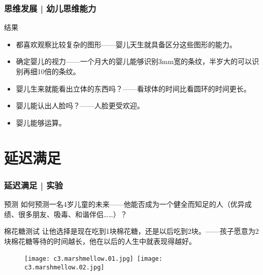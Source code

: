 \begin{frame}
  \frametitle{思维发展 | 幼儿思维能力}
  \begin{block}{结果}
    \begin{itemize}
      \item 都喜欢观察比较复杂的图形——婴儿天生就具备区分这些图形的能力。
      \item 确定婴儿的视力——一个月大的婴儿能够识别3mm宽的条纹，半岁大的可以识别再细10倍的条纹。
      \item 婴儿生来就能看出立体的东西吗？——看球体的时间比看圆环的时间更长。
      \item 婴儿能认出人脸吗？——人脸更受欢迎。
      \item 婴儿能够运算。
    \end{itemize}
  \end{block}
\end{frame}

\section{延迟满足}
\begin{frame}
  \frametitle{延迟满足 | 实验}
  \begin{block}{预测}
    如何预测一名4岁儿童的未来——他能否成为一个健全而知足的人（优异成绩、很多朋友、吸毒、和谐伴侣……）？
  \end{block}
  \pause
  \begin{block}{棉花糖测试}
    让他选择是现在吃到1块棉花糖，还是以后吃到2块。——孩子愿意为2块棉花糖等待的时间越长，他在以后的人生中就表现得越好。
    \vspace{-1em}
    \begin{figure}
      \centering
      \texttt{[image: c3.marshmellow.01.jpg]}\ 
      \texttt{[image: c3.marshmellow.02.jpg]}
    \end{figure}
  \end{block}
\end{frame}

